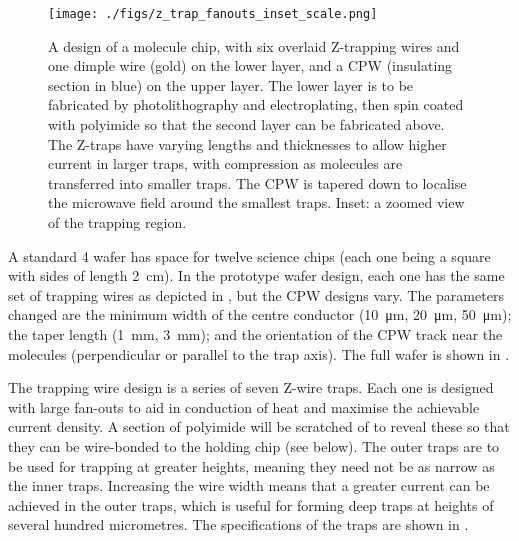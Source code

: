 \begin{figure}[tph]
  \texttt{[image: ./figs/z\_trap\_fanouts\_inset\_scale.png]}
  \caption{
    A design of a molecule chip, with six overlaid Z-trapping wires and one
    dimple wire (gold) on the lower layer, and a CPW (insulating section in
    blue) on the upper layer.  The lower layer is to be fabricated by
    photolithography and electroplating, then spin coated with polyimide so that
    the second layer can be fabricated above. The Z-traps have varying lengths
    and thicknesses to allow higher current in larger traps, with compression as
    molecules are transferred into smaller traps. The CPW is tapered down to
    localise the microwave field around the smallest traps. Inset: a zoomed view
    of the trapping region.
  }
  \label{experiment:fig:chipdesign}
\end{figure}

A standard \SI{4}{\inch} wafer has space for twelve science chips (each one being
a square with sides of length \SI{2}{\centi\metre}). In the prototype wafer
design, each one has the same set of trapping wires as depicted in
, but the CPW designs vary. The parameters
changed are the minimum width of the centre conductor (\SI{10}{\micro\metre},
\SI{20}{\micro\metre}, \SI{50}{\micro\metre}); the taper length
(\SI{1}{\milli\metre}, \SI{3}{\milli\metre}); and the orientation of the CPW
track near the molecules (perpendicular or parallel to the trap axis). The full
wafer is shown in .

The trapping wire design is a series of seven Z-wire traps. Each one is designed
with large fan-outs to aid in conduction of heat and maximise the achievable
current density. A section of polyimide will be scratched of to reveal these so
that they can be wire-bonded to the holding chip (see below). The outer traps
are to be used for trapping at greater heights, meaning they need not be as
narrow as the inner traps. Increasing the wire width means that a greater
current can be achieved in the outer traps, which is useful for forming deep
traps at heights of several hundred micrometres. The specifications of the traps
are shown in .

